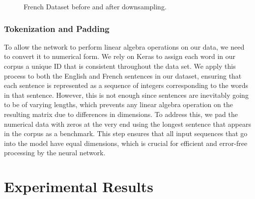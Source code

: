 \documentclass{article}
\begin{document}
\begin{figure}[ht]
      \caption{French Dataset before and after downsampling.}
\end{figure}


\subsubsection{Tokenization and Padding}
To allow the network to perform linear algebra operations 
on our data, we need to convert it to numerical form. We 
rely on Keras to assign each word in our corpus a unique ID
that is consistent throughout the data set. We apply this process to both the English and French sentences in our dataset, ensuring that each sentence is represented as a sequence of integers corresponding to the words in that sentence. However, this is not enough since sentences are inevitably going to be of varying lengths, which prevents any linear algebra operation on the resulting matrix due to differences in dimensions. To address this, we pad the numerical data with zeros at the very end using the longest sentence that appears in the corpus as a benchmark. This step ensures that all input sequences that go into the model have equal dimensions, which is crucial for efficient and error-free processing by the neural network.

\section{Experimental Results}
\end{document}
